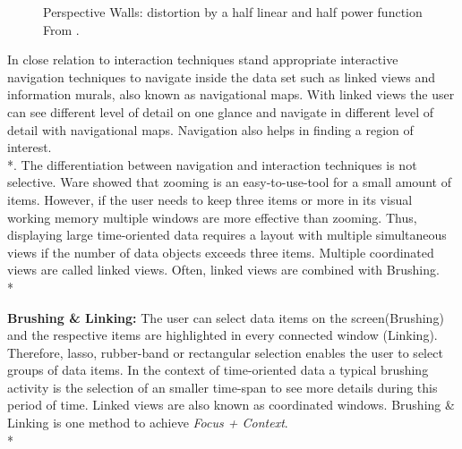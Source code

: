 \begin{figure}[H]
    \centering
    \caption{Perspective Walls: distortion by a half linear and half power function From \cite{Stroe1999}.}
    \label{fig:perspectivewall}
\end{figure}
\par


In close relation to interaction techniques stand appropriate interactive navigation techniques to navigate inside the data set such as linked views and information murals, also known as navigational maps\cite{Jerding1998}. With linked views the user can see different level of detail on one glance and navigate in different level of detail with navigational maps. Navigation also helps in finding a region of interest.\\*. The differentiation between navigation and interaction techniques is not selective. Ware\cite{Ware2012} showed that zooming is an easy-to-use-tool for a small amount of items. However, if the user needs to keep three items or more in its visual working memory multiple windows are more effective than zooming. Thus, displaying large time-oriented data requires a layout with multiple simultaneous views if the number of data objects exceeds three items. Multiple coordinated views are called linked views. Often, linked views are combined with Brushing. \\*

\textbf{Brushing \& Linking: }The user can select data items on the screen(Brushing) and the respective items are highlighted in every connected window (Linking). Therefore, lasso, rubber-band or rectangular selection enables the user to select groups of data items\cite{tegarden1999, Aigner2011}. In the context of time-oriented data a typical brushing activity is the selection of an smaller time-span to see more details during this period of time. Linked views are also known as coordinated windows.
Brushing \& Linking is one method to achieve \textit{Focus + Context}.\\*

